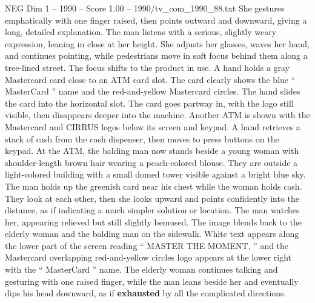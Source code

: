 \begin{textsample}{NEG Dim 1 – 1990 – Score 1.00 – 1990/tv\_com\_1990\_88.txt}
She gestures emphatically with one finger raised, then points outward and downward, giving a long, detailed explanation.
The man listens with a serious, slightly weary expression, leaning in close at her height.
She adjusts her glasses, waves her hand, and continues pointing, while pedestrians move in soft focus behind them along a tree-lined street.
The focus shifts to the product in use.
A hand holds a gray Mastercard card close to an ATM card slot.
The card clearly shows the blue “ MasterCard ” name and the red-and-yellow Mastercard circles.
The hand slides the card into the horizontal slot.
The card goes partway in, with the logo still visible, then disappears deeper into the machine.
Another ATM is shown with the Mastercard and CIRRUS logos below its screen and keypad.
A hand retrieves a stack of cash from the cash dispenser, then moves to press buttons on the keypad.
At the ATM, the balding man now stands beside a young woman with shoulder-length brown hair wearing a peach-colored blouse.
They are outside a light-colored building with a small domed tower visible against a bright blue sky.
The man holds up the greenish card near his chest while the woman holds cash.
They look at each other, then she looks upward and points confidently into the distance, as if indicating a much simpler solution or location.
The man watches her, appearing relieved but still slightly bemused.
The image blends back to the elderly woman and the balding man on the sidewalk.
White text appears along the lower part of the screen reading “ MASTER THE MOMENT, ” and the Mastercard overlapping red-and-yellow circles logo appears at the lower right with the “ MasterCard ” name.
The elderly woman continues talking and gesturing with one raised finger, while the man leans beside her and eventually dips his head downward, as if \textbf{exhausted} by all the complicated directions.

\end{textsample}
